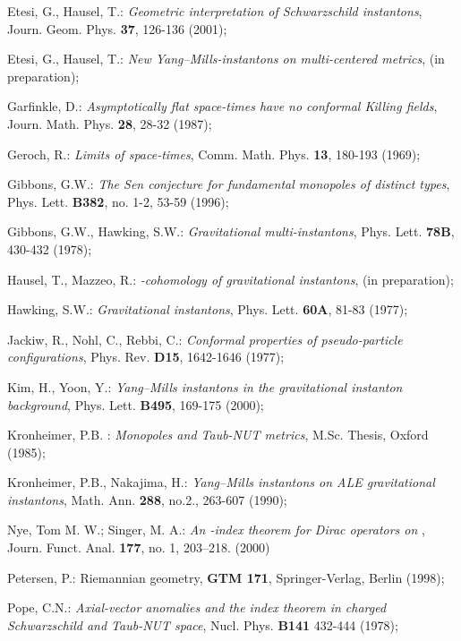 \documentclass[a4paper,12pt,draft]{article}
\begin{document}
\begin{thebibliography}{99}
 Etesi, G., Hausel, T.: {\it Geometric interpretation of 
Schwarzschild instantons}, Journ. Geom. Phys. {\bf 37}, 126-136 (2001);

 Etesi, G., Hausel, T.: {\it New Yang--Mills-instantons
on multi-centered metrics}, (in preparation);

 Garfinkle, D.: {\it Asymptotically flat space-times have no
conformal Killing fields}, Journ. Math. Phys. {\bf 28}, 28-32 (1987);

 Geroch, R.: {\it Limits of space-times},
Comm. Math. Phys. {\bf 13}, 180-193 (1969);

 Gibbons, G.W.: {\it The Sen conjecture for fundamental
monopoles of distinct types}, Phys. Lett. {\bf B382}, no. 1-2,
53-59 (1996);

 Gibbons, G.W., Hawking, S.W.: {\it Gravitational
multi-instantons}, Phys. Lett. {\bf 78B}, 430-432 (1978);

 Hausel, T., Mazzeo, R.: {\it {}\coordHE{}-cohomology of
gravitational instantons}, (in preparation);

 Hawking, S.W.: {\it Gravitational instantons},
Phys. Lett. {\bf 60A}, 81-83 (1977);

 Jackiw, R., Nohl, C., Rebbi, C.: {\it Conformal
properties of pseudo-particle configurations}, Phys. Rev. {\bf D15},
1642-1646 (1977);

 Kim, H., Yoon, Y.: {\it Yang--Mills instantons in the 
gravitational instanton background}, Phys. Lett. {\bf B495}, 169-175
(2000); 

 Kronheimer, P.B. : {\it Monopoles and Taub-NUT metrics}, M.Sc. 
Thesis, Oxford (1985); 

 Kronheimer, P.B., Nakajima, H.: {\it Yang--Mills
instantons on ALE gravitational instantons}, Math. Ann. {\bf 288}, no.2., 
263-607 (1990);

 Nye, Tom M. W.; Singer, M. A.: {\it An \coordHE{}-index
theorem for Dirac operators on \coordHE{}},
Journ. Funct. Anal. {\bf 177}, no. 1, 203--218. (2000)

 Petersen, P.: Riemannian geometry, {\bf GTM 171},
Springer-Verlag, Berlin (1998);

 Pope, C.N.: {\it Axial-vector anomalies and the index
theorem in charged Schwarzschild and Taub-NUT space}, Nucl. Phys. {\bf
B141} 432-444 (1978);


\end{thebibliography}
\end{document}
